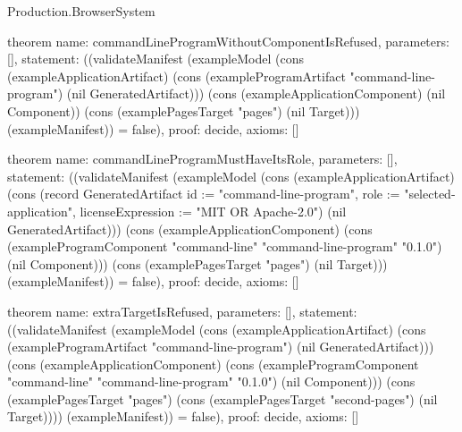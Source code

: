 \begin{lexlean}{Production.BrowserSystem}
\begin{semanticmodule}
theorem{
  name: commandLineProgramWithoutComponentIsRefused,
  parameters: [],
  statement: ((validateManifest (exampleModel (cons (exampleApplicationArtifact) (cons (exampleProgramArtifact "command-line-program") (nil GeneratedArtifact))) (cons (exampleApplicationComponent) (nil Component)) (cons (examplePagesTarget "pages") (nil Target))) (exampleManifest)) = false),
  proof: decide{},
  axioms: []
}

theorem{
  name: commandLineProgramMustHaveItsRole,
  parameters: [],
  statement: ((validateManifest (exampleModel (cons (exampleApplicationArtifact) (cons (record GeneratedArtifact {id := "command-line-program", role := "selected-application", licenseExpression := "MIT OR Apache-2.0"}) (nil GeneratedArtifact))) (cons (exampleApplicationComponent) (cons (exampleProgramComponent "command-line" "command-line-program" "0.1.0") (nil Component))) (cons (examplePagesTarget "pages") (nil Target))) (exampleManifest)) = false),
  proof: decide{},
  axioms: []
}

theorem{
  name: extraTargetIsRefused,
  parameters: [],
  statement: ((validateManifest (exampleModel (cons (exampleApplicationArtifact) (cons (exampleProgramArtifact "command-line-program") (nil GeneratedArtifact))) (cons (exampleApplicationComponent) (cons (exampleProgramComponent "command-line" "command-line-program" "0.1.0") (nil Component))) (cons (examplePagesTarget "pages") (cons (examplePagesTarget "second-pages") (nil Target)))) (exampleManifest)) = false),
  proof: decide{},
  axioms: []
}
\end{semanticmodule}
\end{lexlean}
